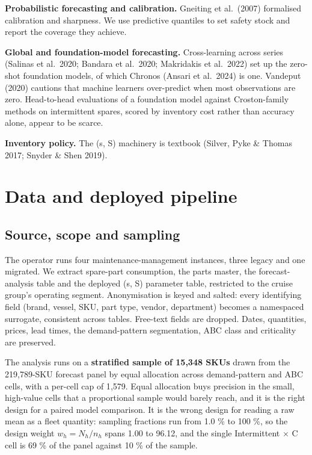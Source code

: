 \documentclass[11pt]{article}
\begin{document}
\textbf{Probabilistic forecasting and calibration.} Gneiting et al.\ (2007)
formalised calibration and sharpness. We use predictive quantiles to set safety
stock and report the coverage they achieve.

\textbf{Global and foundation-model forecasting.} Cross-learning across series
(Salinas et al.\ 2020; Bandara et al.\ 2020; Makridakis et al.\ 2022) set up
the zero-shot foundation models, of which Chronos (Ansari et al.\ 2024) is one.
Vandeput (2020) cautions that machine learners over-predict when most
observations are zero. Head-to-head evaluations of a foundation model against
Croston-family methods on intermittent spares, scored by inventory cost rather
than accuracy alone, appear to be scarce.

\textbf{Inventory policy.} The (s, S) machinery is textbook (Silver, Pyke \&
Thomas 2017; Snyder \& Shen 2019).

\section{Data and deployed pipeline}

\subsection{Source, scope and sampling}

The operator runs four maintenance-management instances, three legacy and one
migrated. We extract spare-part consumption, the parts master, the
forecast-analysis table and the deployed (s, S) parameter table, restricted to
the cruise group's operating segment. Anonymisation is keyed and salted: every
identifying field (brand, vessel, SKU, part type, vendor, department) becomes a
namespaced surrogate, consistent across tables. Free-text fields are dropped.
Dates, quantities, prices, lead times, the demand-pattern segmentation, ABC
class and criticality are preserved.

The analysis runs on a \textbf{stratified sample of 15{,}348 SKUs} drawn from
the 219{,}789-SKU forecast panel by equal allocation across demand-pattern and
ABC cells, with a per-cell cap of 1{,}579. Equal allocation buys precision in
the small, high-value cells that a proportional sample would barely reach, and
it is the right design for a paired model comparison. It is the wrong design
for reading a raw mean as a fleet quantity: sampling fractions run from 1.0 \%
to 100 \%, so the design weight $w_h = N_h / n_h$ spans 1.00 to 96.12, and the
single Intermittent $\times$ C cell is 69 \% of the panel against 10 \% of the
sample.
\end{document}

